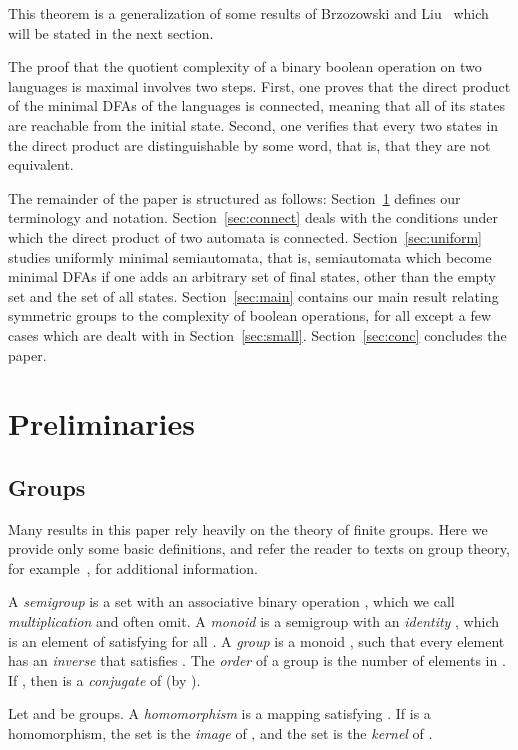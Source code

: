 \documentclass{llncs}
\begin{document}
This theorem is a generalization of some results of Brzozowski and Liu~\cite{Brz12,BrLiu12} which will be stated in the next section.
\medskip

The proof that the quotient complexity of a binary boolean operation on two languages is maximal involves two steps. First, one proves that the direct product of the minimal DFAs of the languages is connected, meaning that all of its states are reachable from the initial state.
Second, one verifies that every two states in the direct product are distinguishable by some word, that is, that they are not equivalent.

The remainder of the paper is structured as follows: Section~\ref{sec:term} defines our terminology and notation. Section~\ref{sec:connect} deals with the conditions under which the direct product of two automata is connected. Section~\ref{sec:uniform} studies uniformly minimal semiautomata, that is, semiautomata which become minimal DFAs if one adds an arbitrary set of final states, other than the empty set and the set of all states. 
Section~\ref{sec:main} contains our main result relating symmetric groups to the complexity of boolean operations, for all except a few cases which are dealt with in Section~\ref{sec:small}.
Section~\ref{sec:conc} concludes the paper.

\section{Preliminaries}
\label{sec:term}

\subsection{Groups}
Many results in this paper rely heavily on the theory of finite groups. Here we provide only some basic definitions, and refer the reader to texts on group theory, for 
example~\cite{Rot65,Suz82}, for additional information.

A \emph{semigroup}  is a set  with an associative binary operation , which we call \emph{multiplication} and often omit. A \emph{monoid}  is a semigroup with an \emph{identity}
, which is an element of  satisfying  for all .
A \emph{group} is a monoid , such that every element  has an \emph{inverse}  that satisfies .
The \emph{order} of a group  is the number of elements in .
If , then  is a \emph{conjugate} of  (by ).

Let  and  be groups.
A \emph{homomorphism}  is a mapping satisfying 
.
If  is a homomorphism, the set  is the \emph{image} of , and the set  is the \emph{kernel} of .
\end{document}
